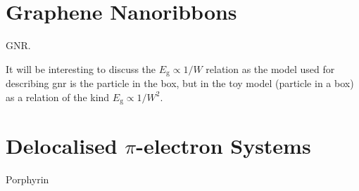 \section{Graphene Nanoribbons}

GNR. 

It will be interesting to discuss the $E_{\text{g}} \propto 1/W$ relation
as the model used for describing gnr is the particle in the box, but in the toy model (particle in a box) 
as a relation of the kind $E_{\text{g}} \propto 1/W^2$.

\section{Delocalised $\pi$-electron Systems}

Porphyrin